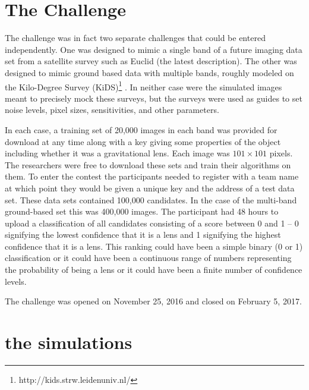 \documentclass[useAMS,usenatbib]{mnras}
\newcommand{\red}[1]{{\color{red} #1}}
\begin{document}
\section{The Challenge}
\label{sec:challenge}

The challenge was in fact two separate challenges that could be entered independently.  One was designed to mimic a single band of a future imaging data set from a satellite survey such as Euclid \citep{***} \red{(the latest description)}.  The other was designed to mimic ground based data with multiple bands, roughly modeled on the Kilo-Degree Survey (KiDS)\footnote{http://kids.strw.leidenuniv.nl/} \citep{2013ExA....35...25D}. In neither case were the simulated images meant to precisely mock these surveys, but the surveys were used as guides to set noise levels, pixel sizes, sensitivities, and other parameters.

In each case, a training set of 20,000 images in each band was provided for download at any time along with a key giving some properties of the object including whether it was a gravitational lens.  Each image was $101\times101$ pixels.  The researchers were free to download these sets and train their algorithms on them.  To enter the contest the participants needed to register with a team name at which point they would be given a unique key and the address of a test data set.  These data sets contained 100,000 candidates.  In the case of the multi-band ground-based set this was 400,000 images. The participant had 48 hours to upload a classification of all candidates consisting of a score between 0 and 1 -- 0 signifying the lowest confidence that it is a lens and 1 signifying the highest confidence that it is a lens.  This ranking could have been a simple binary (0 or 1) classification  or it could have been a continuous range of numbers representing the probability of being a lens or it could have been a finite number of confidence levels.  

The challenge was opened on November 25, 2016 and closed on February 5, 2017.

\section{the simulations}
\label{sec:simulation}
\end{document}

